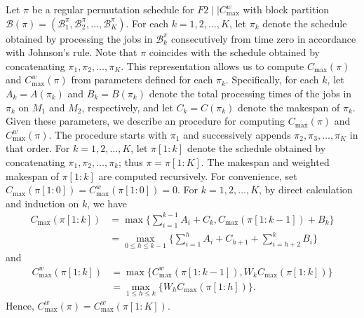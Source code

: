 ﻿\documentclass[12pt]{article} \textheight=24.5cm \textwidth=16.5cm \parskip = 0.165cm
\begin{document}
\begin{sloppypar}
        Let $\pi$ be a regular permutation schedule for $F2 \mid \mid C_{\max}^w$ with block partition $\mathcal{B}(\pi)=(\mathcal{B}_1^{\pi}, \mathcal{B}_2^{\pi}, \ldots, \mathcal{B}_K^{\pi})$.
        For each $k=1, 2, \ldots, K$, let $\pi_k$ denote the schedule obtained by processing the jobs in $\mathcal{B}_k^{\pi}$ consecutively from time zero in accordance with Johnson’s rule.
        Note that $\pi$ coincides with the schedule obtained by concatenating $\pi_1, \pi_2, \ldots, \pi_K$.
        This representation allows us to compute $C_{\max}(\pi)$ and $C_{\max}^w(\pi)$ from parameters defined for each $\pi_k$.
        Specifically, for each $k$, let $A_k=A(\pi_k)$ and $B_k=B(\pi_k)$ denote the total processing times of the jobs in $\pi_k$ on $M_1$ and $M_2$, respectively, and let $C_k=C(\pi_k)$ denote the makespan of $\pi_k$.
        Given these parameters, we describe an procedure for computing $C_{\max}(\pi)$ and $C_{\max}^w(\pi)$.
        The procedure starts with $\pi_1$ and successively appends $\pi_2, \pi_3, \ldots, \pi_K$ in that order.
        For $k=1, 2, \ldots, K$, let $\pi[1:k]$ denote the schedule obtained by concatenating $\pi_1, \pi_2, \ldots, \pi_k$; thus $\pi=\pi[1:K]$.
        The makespan and weighted makespan of $\pi[1: k]$ are computed recursively.
        For convenience, set $C_{\max}(\pi[1: 0])=C_{\max}^w(\pi[1: 0])=0$.
        For $k=1, 2, \ldots, K$, by direct calculation and induction on $k$, we have
        \begin{equation}
            \begin{aligned} \label{eq-4.2:block-makespan}
                C_{\max}(\pi[1: k]) &=\max \Big\{\sum_{i=1}^{k-1} A_i+C_k, C_{\max}(\pi[1: k-1])+B_k\Big\}  \\
                &= \max_{0 \leq h \leq k-1} \Big\{ \sum_{i=1}^h A_i +C_{h+1} + \sum_{i=h+2}^k B_i \Big\}
            \end{aligned}
        \end{equation}
        and
        \begin{equation}\label{eq-4.2:block-weighted makespan}
            \begin{aligned}
                C_{\max}^w(\pi[1: k]) &=\max \{C_{\max}^w(\pi[1: k-1]), W_k C_{\max}(\pi[1: k])\}  \\
                &= \max_{1 \leq h \leq k} \{W_h C_{\max}(\pi[1: h])\}.
            \end{aligned}
        \end{equation}
        Hence, $C_{\max}^w(\pi)=C_{\max}^w(\pi[1: K])$.


\end{sloppypar}
\end{document}
